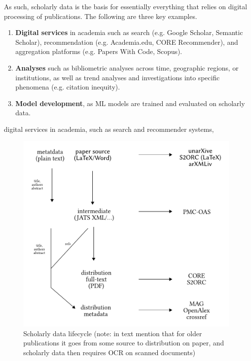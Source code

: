 As such, scholarly data is the basis for essentially everything that relies on digital processing of publications. The following are three key examples.
\begin{enumerate}
    \item \textbf{Digital services} in academia such as search (e.g. Google Scholar, Semantic Scholar), recommendation (e.g. Academia.edu, CORE Recommender), and aggregation platforms (e.g. Papers With Code, Scopus).  %
    \item \textbf{Analyses} such as bibliometric analyses across time, geographic regions, or institutions, as well as trend analyses and investigations into specific phenomena (e.g. citation inequity).
    \item \textbf{Model development}, as ML models are trained and evaluated on scholarly data.
\end{enumerate}

digital services in academia, such as search and recommender systems, 

\begin{figure}[bt]
  \centering
  \includegraphics[width=0.7\linewidth]{figures/foundations/scholarly_data_lifecycle_dummy}
  \caption[Scholarly data lifecycle]{Scholarly data lifecycle (note: in text mention that for older publications it goes from some source to distribution on paper, and scholarly data then requires OCR on scanned documents)}
  \label{fig:foundations-datalifecycle}
\end{figure}

